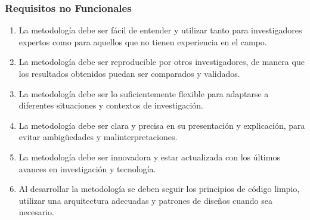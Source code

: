 \subsubsection{Requisitos no Funcionales}
\begin{enumerate}
    \renewcommand{\labelenumi}{RNF\arabic{enumi}}
    \item La metodología debe ser fácil de entender y utilizar tanto para 
    investigadores expertos como para aquellos que no tienen experiencia en el campo.
    \item La metodología debe ser reproducible por otros investigadores, de manera 
    que los resultados obtenidos puedan ser comparados y validados.
    \item La metodología debe ser lo suficientemente flexible para adaptarse a 
    diferentes situaciones y contextos de investigación.
    \item La metodología debe ser clara y precisa en su presentación y explicación, 
    para evitar ambigüedades y malinterpretaciones.
    \item La metodología debe ser innovadora y estar actualizada con los últimos 
    avances en investigación y tecnología. 
    \item Al desarrollar la metodología se deben seguir los principios de código limpio, 
    utilizar una arquitectura adecuadas y patrones de diseños cuando sea necesario.
\end{enumerate}
